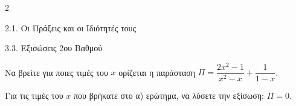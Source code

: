 \begin{ylh}{2}
    \item 2.1. Οι Πράξεις και οι Ιδιότητές τους
    \item 3.3. Εξισώσεις 2ου Βαθμού
\end{ylh}

\begin{alist}
\item Να βρείτε για ποιες τιμές του $x$ ορίζεται η παράσταση $\Pi = \dfrac{2x^2-1}{x^2-x} + \dfrac{1}{1-x}$. 
\item Για τις τιμές του $x$ που βρήκατε στο α) ερώτημα, να λύσετε την εξίσωση: $\Pi = 0$. 
\end{alist}

